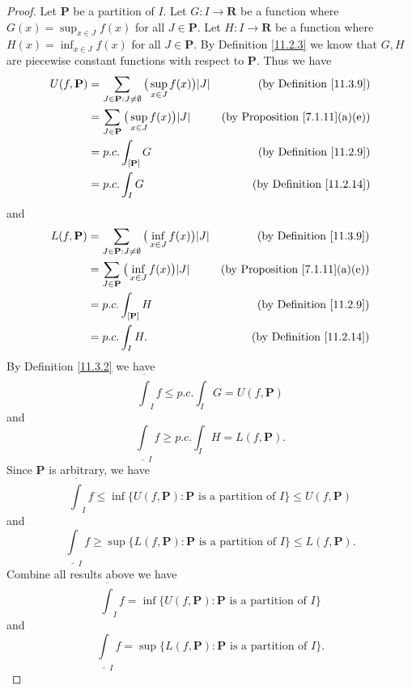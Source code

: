 \begin{proof}
    Let \(\mathbf{P}\) be a partition of \(I\).
    Let \(G : I \to \mathbf{R}\) be a function where \(G(x) = \sup_{x \in J} f(x)\) for all \(J \in \mathbf{P}\).
    Let \(H : I \to \mathbf{R}\) be a function where \(H(x) = \inf_{x \in J} f(x)\) for all \(J \in \mathbf{P}\).
    By Definition \ref{11.2.3} we know that \(G, H\) are piecewise constant functions with respect to \(\mathbf{P}\).
    Thus we have
    \begin{align*}
        U(f, \mathbf{P}) & = \sum_{J \in \mathbf{P} : J \neq \emptyset} \big(\sup_{x \in J} f(x)\big) \abs*{J} & \text{(by Definition \ref{11.3.9})}        \\
                         & = \sum_{J \in \mathbf{P}} \big(\sup_{x \in J} f(x)\big) \abs*{J}                    & \text{(by Proposition \ref{7.1.11}(a)(e))} \\
                         & = p.c. \int_{[\mathbf{P}]} G                                                        & \text{(by Definition \ref{11.2.9})}        \\
                         & = p.c. \int_I G                                                                     & \text{(by Definition \ref{11.2.14})}
    \end{align*}
    and
    \begin{align*}
        L(f, \mathbf{P}) & = \sum_{J \in \mathbf{P} : J \neq \emptyset} \big(\inf_{x \in J} f(x)\big) \abs*{J} & \text{(by Definition \ref{11.3.9})}        \\
                         & = \sum_{J \in \mathbf{P}} \big(\inf_{x \in J} f(x)\big) \abs*{J}                    & \text{(by Proposition \ref{7.1.11}(a)(e))} \\
                         & = p.c. \int_{[\mathbf{P}]} H                                                        & \text{(by Definition \ref{11.2.9})}        \\
                         & = p.c. \int_I H.                                                                    & \text{(by Definition \ref{11.2.14})}
    \end{align*}
    By Definition \ref{11.3.2} we have
    \[
        \overline{\int}_I f \leq p.c. \int_I G = U(f, \mathbf{P})
    \]
    and
    \[
        \underline{\int}_I f \geq p.c. \int_I H = L(f, \mathbf{P}).
    \]
    Since \(\mathbf{P}\) is arbitrary, we have
    \[
        \overline{\int}_I f \leq \inf \big\{U(f, \mathbf{P}) : \mathbf{P} \text{ is a partition of } I\big\} \leq U(f, \mathbf{P})
    \]
    and
    \[
        \underline{\int}_I f \geq \sup \big\{L(f, \mathbf{P}) : \mathbf{P} \text{ is a partition of } I\big\} \leq L(f, \mathbf{P}).
    \]
    Combine all results above we have
    \[
        \overline{\int}_I f = \inf \big\{U(f, \mathbf{P}) : \mathbf{P} \text{ is a partition of } I\big\}
    \]
    and
    \[
        \underline{\int}_I f = \sup \big\{L(f, \mathbf{P}) : \mathbf{P} \text{ is a partition of } I\big\}.
    \]
\end{proof}

